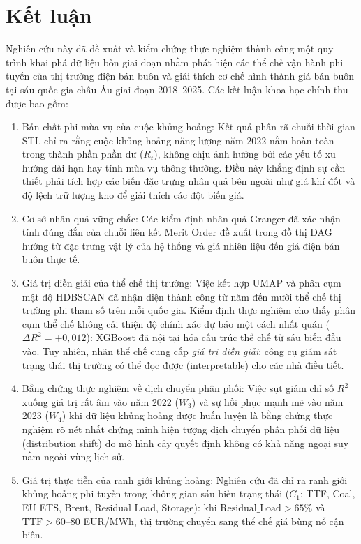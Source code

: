 
\section{Kết luận}

Nghiên cứu này đã đề xuất và kiểm chứng thực nghiệm thành công một quy trình khai phá dữ liệu bốn giai đoạn nhằm phát hiện các thể chế vận hành phi tuyến của thị trường điện bán buôn và giải thích cơ chế hình thành giá bán buôn tại sáu quốc gia châu Âu giai đoạn 2018--2025. Các kết luận khoa học chính thu được bao gồm:

\begin{enumerate}
  \item Bản chất phi mùa vụ của cuộc khủng hoảng: Kết quả phân rã chuỗi thời gian STL chỉ ra rằng cuộc khủng hoảng năng lượng năm 2022 nằm hoàn toàn trong thành phần phần dư ($R_t$), không chịu ảnh hưởng bởi các yếu tố xu hướng dài hạn hay tính mùa vụ thông thường. Điều này khẳng định sự cần thiết phải tích hợp các biến đặc trưng nhân quả bên ngoài như giá khí đốt và độ lệch trữ lượng kho để giải thích các đột biến giá.
  \item Cơ sở nhân quả vững chắc: Các kiểm định nhân quả Granger đã xác nhận tính đúng đắn của chuỗi liên kết Merit Order đề xuất trong đồ thị DAG hướng từ đặc trưng vật lý của hệ thống và giá nhiên liệu đến giá điện bán buôn thực tế.
  \item Giá trị diễn giải của thể chế thị trường: Việc kết hợp UMAP và phân cụm mật độ HDBSCAN đã nhận diện thành công từ năm đến mười thể chế thị trường phi tham số trên mỗi quốc gia. Kiểm định thực nghiệm cho thấy phân cụm thể chế không cải thiện độ chính xác dự báo một cách nhất quán ($\Delta R^2 = +0,012$): XGBoost đã nội tại hóa cấu trúc thể chế từ sáu biến đầu vào. Tuy nhiên, nhãn thể chế cung cấp \textit{giá trị diễn giải}: công cụ giám sát trạng thái thị trường có thể đọc được (interpretable) cho các nhà điều tiết.
  \item Bằng chứng thực nghiệm về dịch chuyển phân phối: Việc sụt giảm chỉ số $R^2$ xuống giá trị rất âm vào năm 2022 ($W_3$) và sự hồi phục mạnh mẽ vào năm 2023 ($W_4$) khi dữ liệu khủng hoảng được huấn luyện là bằng chứng thực nghiệm rõ nét nhất chứng minh hiện tượng dịch chuyển phân phối dữ liệu (distribution shift) do mô hình cây quyết định không có khả năng ngoại suy nằm ngoài vùng lịch sử.
  \item Giá trị thực tiễn của ranh giới khủng hoảng: Nghiên cứu đã chỉ ra ranh giới khủng hoảng phi tuyến trong không gian sáu biến trạng thái ($C_1$: TTF, Coal, EU ETS, Brent, Residual Load, Storage): khi $\text{Residual\_Load} > 65\%$ và $\text{TTF} > 60\text{--}80$ EUR/MWh, thị trường chuyển sang thể chế giá bùng nổ cận biên.
\end{enumerate}

